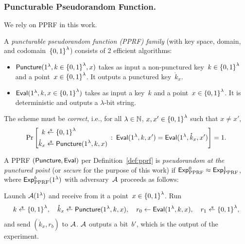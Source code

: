 \subsubsection{Puncturable Pseudorandom Function.}
We rely on PPRF in this work.

\begin{definition}[PPRF]\label{def:pprf}
A \emph{puncturable pseudorandom function (PPRF) family} (with key space, domain, and codomain~${\{0,1\}}^\lambda$) consists of 2 efficient algorithms:
\begin{itemize}
\item ${\smash{\mathsf{Puncture}}}(1^\lambda,k\in{\{0,1\}}^\lambda,x)$
takes as input a non-punctured key~${k\in{\{0,1\}}^\lambda}$ and a point~${x\in{\{0,1\}}^\lambda}$.
It outputs a punctured key~$\mathring{k}_x$.
\item ${\smash{\mathsf{Eval}}}(1^\lambda,k,x\in{\{0,1\}}^\lambda)$
takes as input a key~$k$ and a point~${x\in{\{0,1\}}^\lambda}$.
It is deterministic and outputs a $\lambda$-bit string.
\end{itemize}
The scheme must be \emph{correct}, i.e., for all
${\lambda\in{\mathbb{N}}}$,
${x,x'\in{\{0,1\}}^\lambda}$ such that ${x\neq x'}$,
\begin{align*}
\Pr\left[
\begin{aligned}
k&{}\draws\bit^\lambda\\
\mathring{k}_x&{}\draws\Puncture(1^\lambda,k,x)
\end{aligned}
\::\:
\Eval(1^\lambda,k,x')
=
\Eval(1^\lambda,\mathring{k}_x,x')
\right]=1.
\end{align*}
\end{definition}

\begin{definition}\label{def:pprf-security}
A PPRF $({\smash{\mathsf{Puncture}}},{\smash{\mathsf{Eval}}})$ per Definition~\ref{def:pprf} is \emph{pseudorandom at the punctured point} (or \emph{secure} for the purpose of this work)
if ${{\smash{\mathsf{Exp}}_{\textup{PPRF}}^{0}}\approx{\smash{\mathsf{Exp}}_{\textup{PPRF}}^{1}}}$,
where ${\smash{\mathsf{Exp}}_{\textup{PPRF}}^{b}}(1^\lambda)$ with adversary~${\mathcal{A}}$ proceeds as follows:
\begin{security}
Launch ${\mathcal{A}}(1^\lambda)$ and receive from it a point~${x\in{\{0,1\}}^\lambda}$.
Run
\begin{align*}
\WideNarrow{}{\hspace*{-1.2em}}
k\draws\bit^\lambda,\quad
\mathring{k}_x\draws\Puncture(1^\lambda,k,x),\quad
r_0\gets\Eval(1^\lambda,k,x),\quad
r_1\draws\bit^\lambda,
\end{align*}
and send $(\mathring{k}_x,r_b)$ to ${\mathcal{A}}$.
${\mathcal{A}}$ outputs a bit~$b'$, which is the output of the experiment.
\end{security}
\end{definition}

